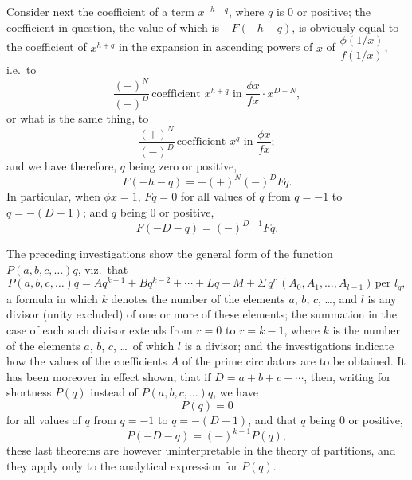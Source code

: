 \documentclass[11pt]{article}
\begin{document}
Consider next the coefficient of a term $x^{-h-q}$, where $q$ is $0$ or positive; the coefficient in question, the value of which is $-F(-h-q)$, is obviously equal to the coefficient of $x^{h+q}$ in the expansion in ascending powers of $x$ of $\dfrac{\phi(1/x)}{f(1/x)}$, i.e.\ to
\[
\frac{(+)^N}{(-)^D}\,\text{coefficient } x^{h+q} \text{ in } \frac{\phi x}{f x}\cdot x^{D-N},
\]
or what is the same thing, to
\[
\frac{(+)^N}{(-)^D}\,\text{coefficient } x^q \text{ in } \frac{\phi x}{f x};
\]
and we have therefore, $q$ being zero or positive,
\[
F(-h-q) = -(+)^N(-)^D F q.
\]
In particular, when $\phi x = 1$, $F q = 0$ for all values of $q$ from $q = -1$ to $q = -(D-1)$; and $q$ being $0$ or positive,
\[
F(-D-q) = (-)^{D-1} F q.
\]

The preceding investigations show the general form of the function $P(a, b, c, \ldots) q$, viz.\ that
\[
P(a, b, c, \ldots) q = A q^{k-1} + B q^{k-2} + \cdots + L q + M + \Sigma\,q^r\,(A_0, A_1, \ldots, A_{l-1})\,\text{per } l_q,
\]
a formula in which $k$ denotes the number of the elements $a$, $b$, $c$, \ldots, and $l$ is any divisor (unity excluded) of one or more of these elements; the summation in the case of each such divisor extends from $r=0$ to $r=k-1$, where $k$ is the number of the elements $a$, $b$, $c$, \ldots\ of which $l$ is a divisor; and the investigations indicate how the values of the coefficients $A$ of the prime circulators are to be obtained. It has been moreover in effect shown, that if $D = a + b + c + \cdots$, then, writing for shortness $P(q)$ instead of $P(a, b, c, \ldots) q$, we have
\[
P(q) = 0
\]
for all values of $q$ from $q = -1$ to $q = -(D-1)$, and that $q$ being $0$ or positive,
\[
P(-D - q) = (-)^{k-1} P(q);
\]
these last theorems are however uninterpretable in the theory of partitions, and they apply only to the analytical expression for $P(q)$.
\end{document}
